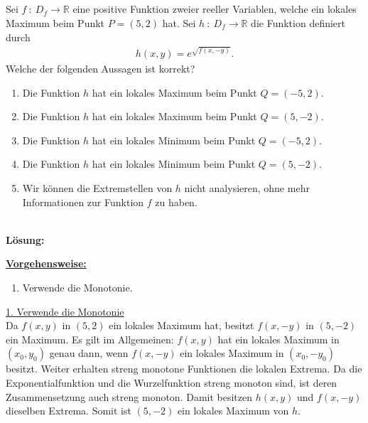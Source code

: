 \subsection*{}
Sei $ f \ : \ D_f \to \mathbb{R} $ eine positive Funktion zweier reeller Variablen, welche ein lokales Maximum beim Punkt $ P = (5,2)  $ hat.
Sei $ h  \ : \ D_f \to \mathbb{R} $ die Funktion definiert durch
\begin{align*}
	h(x,y) = e^{\sqrt{f(x,-y)}}.
\end{align*} 
Welche der folgenden Aussagen ist korrekt?
\renewcommand{\labelenumi}{(\alph{enumi})}
\begin{enumerate}
	\item Die Funktion $ h $ hat ein lokales Maximum beim Punkt $ Q = (-5,2). $
	\item Die Funktion $ h $ hat ein lokales Maximum beim Punkt $ Q = (5,-2). $
	\item Die Funktion $ h $ hat ein lokales Minimum beim Punkt $ Q = (-5,2). $
	\item Die Funktion $ h $ hat ein lokales Minimum beim Punkt $ Q = (5,-2). $
	\item Wir können die Extremstellen von $ h $ nicht analysieren, ohne mehr Informationen zur Funktion $ f $ zu haben.
\end{enumerate}
\ \\
\textbf{Lösung:}
\begin{mdframed}
	\underline{\textbf{Vorgehensweise:}}
	\renewcommand{\labelenumi}{\theenumi.}
	\begin{enumerate}
		\item Verwende die Monotonie.
	\end{enumerate}
\end{mdframed}
\underline{1. Verwende die Monotonie}\\
Da $ f(x,y) $ in  $ (5,2) $ ein lokales Maximum hat, besitzt $ f(x,-y) $ in $ (5,-2) $ ein Maximum. 
Es gilt im Allgemeinen: $ f(x,y) $ hat ein lokales Maximum in $ (x_0,y_0) $ genau dann, wenn $ f(x,-y) $ ein lokales Maximum in $ (x_0,-y_0) $ besitzt.
Weiter erhalten streng monotone Funktionen die lokalen Extrema.
Da die Exponentialfunktion und die Wurzelfunktion streng monoton sind, ist deren Zusammensetzung auch streng monoton. Damit besitzen $ h(x,y) $ und $ f(x,-y) $ dieselben Extrema. Somit ist $ (5,-2) $ ein lokales Maximum von $ h$. 


\newpage
